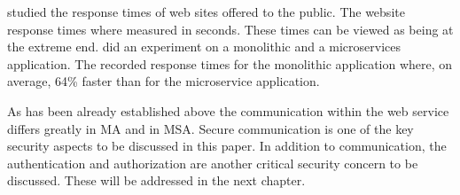 \begin{sloppypar}
    \citet{webdelays} studied the response times of web sites offered to the
    public. The website response times where measured in seconds. These times
    can be viewed as being at the extreme end. \citet{Johansson_2019} did an
    experiment on a monolithic and a microservices application. The recorded
    response times for the monolithic application where, on average, 64\% faster
    than for the microservice application.
\end{sloppypar}

\begin{sloppypar}
    As has been already established above the communication within the web
    service differs greatly in MA and in MSA. Secure communication is one of the
    key security aspects to be discussed in this paper. In addition to
    communication, the authentication and authorization are another critical
    security concern to be discussed. These will be addressed in the next
    chapter.
\end{sloppypar}


